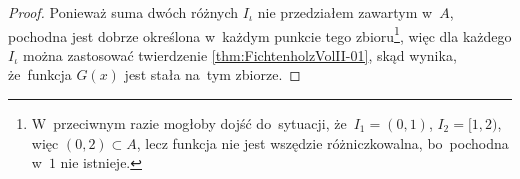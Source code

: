 \documentclass[a4paper,11pt]{article}
\begin{document}
\begin{proof}

  Ponieważ suma dwóch różnych $I_{ \iota }$ nie przedziałem zawartym
  w~$A$, pochodna jest dobrze określona w~każdym punkcie tego
  zbioru\footnote{W~przeciwnym razie mogłoby dojść do~sytuacji,
    że~$I_{ 1 } = (0, 1)$, $I_{ 2 } = [ 1, 2 )$, więc
    $( 0, 2 ) \subset A$, lecz funkcja nie jest wszędzie
    różniczkowalna, bo~pochodna w~$1$ nie istnieje.}, więc dla każdego
  $I_{ \iota }$ można zastosować twierdzenie
  \ref{thm:FichtenholzVolII-01}, skąd wynika, że~funkcja $G( x )$ jest
  stała na~tym zbiorze.

\end{proof}










\end{document}
